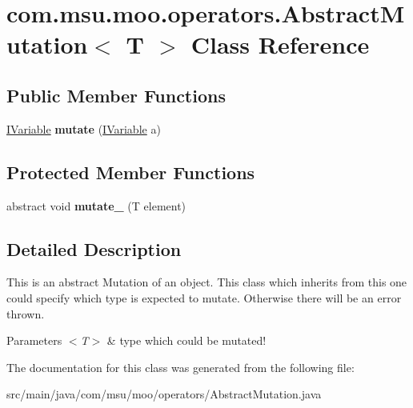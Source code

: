 \hypertarget{classcom_1_1msu_1_1moo_1_1operators_1_1AbstractMutation_3_01T_01_4}{\section{com.\-msu.\-moo.\-operators.\-Abstract\-Mutation$<$ T $>$ Class Reference}
\label{classcom_1_1msu_1_1moo_1_1operators_1_1AbstractMutation_3_01T_01_4}
}
\subsection*{Public Member Functions}
\begin{DoxyCompactItemize}
\item 
\hypertarget{classcom_1_1msu_1_1moo_1_1operators_1_1AbstractMutation_3_01T_01_4_a71b24427e5e7a377893158d84ad69179}{\hyperlink{interfacecom_1_1msu_1_1moo_1_1model_1_1interfaces_1_1IVariable}{I\-Variable} {\bfseries mutate} (\hyperlink{interfacecom_1_1msu_1_1moo_1_1model_1_1interfaces_1_1IVariable}{I\-Variable} a)}\label{classcom_1_1msu_1_1moo_1_1operators_1_1AbstractMutation_3_01T_01_4_a71b24427e5e7a377893158d84ad69179}

\end{DoxyCompactItemize}
\subsection*{Protected Member Functions}
\begin{DoxyCompactItemize}
\item 
\hypertarget{classcom_1_1msu_1_1moo_1_1operators_1_1AbstractMutation_3_01T_01_4_a91fc93fc85d9b67767545fd6490d0fc0}{abstract void {\bfseries mutate\-\_\-} (T element)}\label{classcom_1_1msu_1_1moo_1_1operators_1_1AbstractMutation_3_01T_01_4_a91fc93fc85d9b67767545fd6490d0fc0}

\end{DoxyCompactItemize}


\subsection{Detailed Description}
This is an abstract Mutation of an object. This class which inherits from this one could specify which type is expected to mutate. Otherwise there will be an error thrown.


\begin{DoxyParams}{Parameters}
{\em $<$\-T$>$} & type which could be mutated! \\
\hline
\end{DoxyParams}


The documentation for this class was generated from the following file\-:\begin{DoxyCompactItemize}
\item 
src/main/java/com/msu/moo/operators/Abstract\-Mutation.\-java\end{DoxyCompactItemize}
